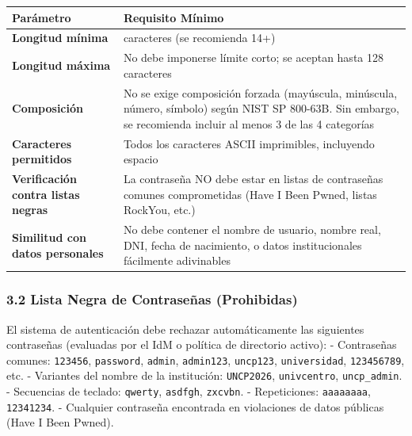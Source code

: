 \documentclass[10pt,letterpaper]{article}
\begin{document}
{\setlength{\RaggedRightRightskip}{0pt plus 5em}\small\sloppy \begin{longtable}[]{@{}
  >{\hspace{0pt}\RaggedRight\arraybackslash}p{}
  >{\hspace{0pt}\RaggedRight\arraybackslash}p{}@{}}
\toprule\noalign{}
\begin{minipage}[b]{\linewidth}\raggedright
Parámetro
\end{minipage} & \begin{minipage}[b]{\linewidth}\raggedright
Requisito Mínimo
\end{minipage} \\
\midrule\noalign{}
\endhead
\bottomrule\noalign{}
\endlastfoot
\textbf{Longitud mínima} & 12 caracteres (se recomienda 14+) \\
\textbf{Longitud máxima} & No debe imponerse límite corto; se aceptan
hasta 128 caracteres \\
\textbf{Composición} & No se exige composición forzada (mayúscula,
minúscula, número, símbolo) según NIST SP 800-63B. Sin embargo, se
recomienda incluir al menos 3 de las 4 categorías \\
\textbf{Caracteres permitidos} & Todos los caracteres ASCII imprimibles,
incluyendo espacio \\
\textbf{Verificación contra listas negras} & La contraseña NO debe estar
en listas de contraseñas comunes comprometidas (Have I Been Pwned,
listas RockYou, etc.) \\
\textbf{Similitud con datos personales} & No debe contener el nombre de
usuario, nombre real, DNI, fecha de nacimiento, o datos institucionales
fácilmente adivinables \\
\end{longtable}\normalsize}

\subsubsection{3.2 Lista Negra de Contraseñas
(Prohibidas)}\label{lista-negra-de-contraseuxf1as-prohibidas}

El sistema de autenticación debe rechazar automáticamente las siguientes
contraseñas (evaluadas por el IdM o política de directorio activo): -
Contraseñas comunes: \texttt{123456}, \texttt{password}, \texttt{admin},
\texttt{admin123}, \texttt{uncp123}, \texttt{universidad},
\texttt{123456789}, etc. - Variantes del nombre de la institución:
\texttt{UNCP2026}, \texttt{univcentro}, \texttt{uncp\_admin}. -
Secuencias de teclado: \texttt{qwerty}, \texttt{asdfgh},
\texttt{zxcvbn}. - Repeticiones: \texttt{aaaaaaaa}, \texttt{12341234}. -
Cualquier contraseña encontrada en violaciones de datos públicas (Have I
Been Pwned).
\end{document}
